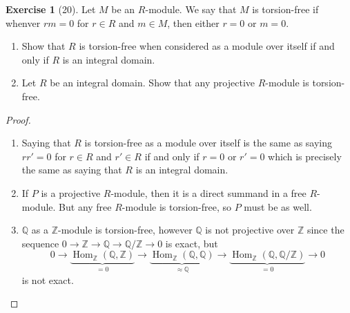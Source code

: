 \documentclass[reqno]{amsart}
\theoremstyle{definition}
\newtheorem{exercise}[theorem]{Exercise}
\theoremstyle{remark}
\DeclareMathOperator{\Hom}{Hom}
\begin{document}
    \begin{exercise}[20]
        Let $M$ be an $R$-module. We say that
        $M$ is torsion-free if whenver
        $rm = 0$ for $r \in R$ and $m \in M$, then
        either $r = 0$ or $m=0$.
        \begin{enumerate}
            \item Show that $R$ is torsion-free
                when considered as a module over itself
                if and only if $R$ is an integral domain.
            \item Let $R$ be an integral domain.
                Show that any projective $R$-module is
                torsion-free.
        \end{enumerate}

    \end{exercise}

    \begin{proof}
        \begin{enumerate}
            \item Saying that $R$ is torsion-free as a 
                module over itself is the same as saying
                $r r' = 0$ for $r \in R$ and $r' \in R$ 
                if and only if $r = 0$ or $r' =0$ which
                is precisely the same as saying that
                $R$ is an integral domain.

            \item If $P$ is a projective $R$-module,
                then it is a direct summand in a free
                $R$-module. But any free $R$-module is
                torsion-free, so $P$ must be as well.

            \item $\mathbb{Q}$ as a $\mathbb{Z}$-module
                is torsion-free, however
                $\mathbb{Q}$ is not projective over
                $\mathbb{Z}$ since
                the sequence
                $0 \to \mathbb{Z} \to \mathbb{Q} \to 
                \mathbb{Q} / \mathbb{Z} \to 0$ is exact, but
                \[0 \to \underbrace{\Hom_{\mathbb{Z}}\left(
                        \mathbb{Q},
                \mathbb{Z}\right)}_{=0} \to 
                \underbrace{\Hom_{\mathbb{Z}}
                \left( \mathbb{Q},\mathbb{Q} \right)}_{\approx 
            \mathbb{Q}}
                \to \underbrace{\Hom_{\mathbb{Z}} 
                \left( \mathbb{Q}, \mathbb{Q} / \mathbb{Z} \right)}_{
            = 0}
            \to  0\]
            is not exact.





        \end{enumerate}
    \end{proof}
\end{document}
